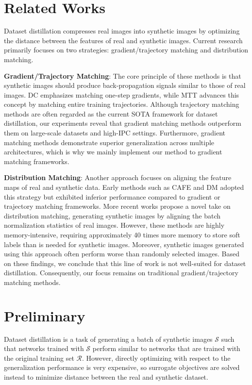 \documentclass{article}
\theoremstyle{plain}
\theoremstyle{definition}
\theoremstyle{remark}
\begin{document}
\section{Related Works}
Dataset distillation compresses real images into synthetic images by optimizing the distance between the features of real and synthetic images. Current research primarily focuses on two strategies: gradient/trajectory matching and distribution matching.

\textbf{Gradient/Trajectory Matching}: The core principle of these methods is that synthetic images should produce back-propagation signals similar to those of real images. DC emphasizes matching one-step gradients, while MTT advances this concept by matching entire training trajectories. Although trajectory matching methods are often regarded as the current SOTA framework for dataset distillation, our experiments reveal that gradient matching methods outperform them on large-scale datasets and high-IPC settings. Furthermore, gradient matching methods demonstrate superior generalization across multiple architectures, which is why we mainly implement our method to gradient matching frameworks.

\textbf{Distribution Matching}: Another approach focuses on aligning the feature maps of real and synthetic data. Early methods such as CAFE and DM adopted this strategy but exhibited inferior performance compared to gradient or trajectory matching frameworks. More recent works propose a novel take on distribution matching, generating synthetic images by aligning the batch normalization statistics of real images. However, these methods are highly memory-intensive, requiring approximately 40 times more memory to store soft labels than is needed for synthetic images. Moreover, synthetic images generated using this approach often perform worse than randomly selected images. Based on these findings, we conclude that this line of work is not well-suited for dataset distillation. Consequently, our focus remains on traditional gradient/trajectory matching methods.

\section{Preliminary}

Dataset distillation is a task of generating a batch of synthetic images $\mathcal{S}$ such that networks trained with $\mathcal{S}$ perform similar to networks that are trained with the original training set $\mathcal{R}$. However, directly optimizing with respect to the generalization performance is very expensive, so surrogate objectives are solved instead to minimize distance between the real and synthetic dataset.
\end{document}
